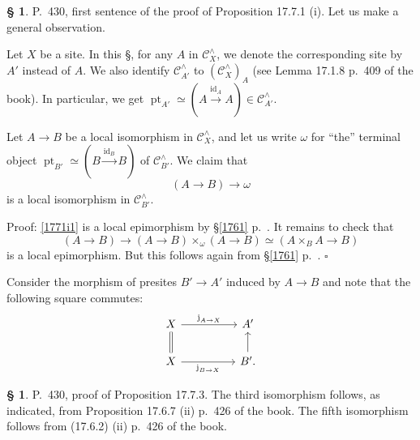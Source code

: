 \documentclass[12pt]{article}%
\theoremstyle{remark}
\theoremstyle{definition}
\newtheorem{s}[thm]{\S}%
\newcommand{\oo}{\operatorname}
\newcommand{\C}{\mathcal C}
\newcommand{\xr}{\xrightarrow}
\DeclareMathOperator{\id}{id}
\begin{document}
\begin{s} 
P.~430, first sentence of the proof of Proposition 17.7.1 (i). Let us make a general observation. 

Let $X$ be a site. In this \S, for any $A$ in $\C_X^\wedge$, we denote the corresponding site by $A'$ instead of $A$. We also identify $\C_{A'}^\wedge$ to $(\C_X^\wedge)_A$ (see Lemma 17.1.8 p.~409 of the book). In particular, we get $\oo{pt}_{A'}\simeq(A\xr{\id_A}A)\in\C_{A'}^\wedge$. 

Let $A\to B$ be a local isomorphism in $\C_X^\wedge$, and let us write $\omega$ for ``the'' terminal object $\oo{pt}_{B'}\simeq(B\xr{\id_B}B)$ of $\C_{B'}^\wedge$. We claim that 
\begin{equation}\label{1771i1}
(A\to B)\to\omega 
\end{equation} 
is a local isomorphism in $\C_{B'}^\wedge$.

Proof: \eqref{1771i1} is a local epimorphism by \S\ref{1761} p.~\pageref{1761}. It remains to check that 
\begin{equation}\label{1771i2}
(A\to B)\to(A\to B)\times_\omega(A\to B)\simeq(A\times_BA\to B)
\end{equation} 
is a local epimorphism. But this follows again from \S\ref{1761} p.~\pageref{1761}. $\square$ 

Consider the morphism of presites $B'\to A'$ induced by $A\to B$ and note that the following square commutes: 
$$
\begin{tikzcd} 
X\ar{rr}{\oo j_{A\to X}}\ar[equal]{d}&&A'\\ 
X\ar{rr}[swap]{\oo j_{B\to X}}&&B'.\ar{u}
\end{tikzcd}
$$ 
\end{s} 

%

\begin{s} 
P.~430, proof of Proposition 17.7.3. The third isomorphism follows, as indicated, from Proposition 17.6.7 (ii) p.~426 of the book. The fifth isomorphism follows from (17.6.2) (ii) p.~426 of the book. 
\end{s} 

%
\end{document}

